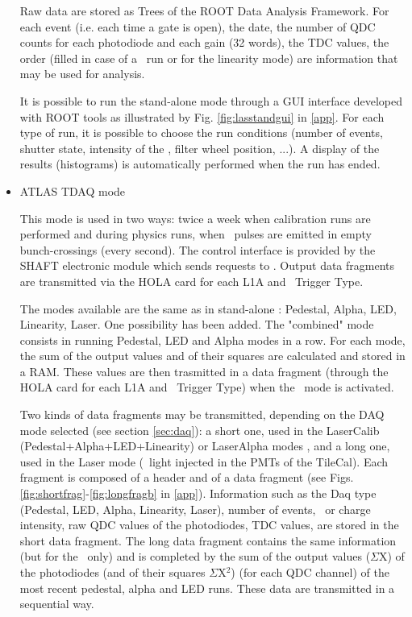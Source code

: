 \begin{itemize}
Raw data are stored as Trees of the ROOT \cite{ref:root} Data Analysis Framework. For each event (i.e. each time a gate is open), the date, the number of QDC counts for each photodiode and each gain (32 words), the TDC values, the order (filled in case of a \laser~run or for the linearity mode) are information that may be used for analysis. 

It is possible to run the stand-alone mode through a GUI interface developed with ROOT tools as illustrated by Fig. \ref{fig:lasstandgui} in \ref{app}. For each type of run, it is possible to choose the run conditions (number of events, shutter state, intensity of the \laser, filter wheel position, ...). A display of the results (histograms) is automatically performed when the run has ended.

\item ATLAS TDAQ mode

This mode is used in two ways: twice a week when calibration runs are performed and during physics runs, when \laser~pulses are emitted in empty bunch-crossings (every second). The control interface is provided by the SHAFT electronic module which sends requests to \lascar. Output data fragments are transmitted via the HOLA card for each L1A and \laser~Trigger Type.

The modes available are the same as in stand-alone : Pedestal, Alpha, LED, Linearity, Laser. One possibility has been added. The "combined" mode consists in running Pedestal, LED and Alpha modes in a row. For each mode, the sum of the output values and of their squares are calculated and stored in a RAM. These values are then trasmitted in a data fragment (through the HOLA card for each L1A and \laser~Trigger Type) when the \laser~mode is activated.

Two kinds of data fragments may be transmitted, depending on the DAQ mode selected (see section \ref{sec:daq}): a short one, used in the LaserCalib (Pedestal+Alpha+LED+Linearity) or LaserAlpha modes , and a long one, used in the Laser mode (\laser~light injected in the PMTs of the TileCal). Each fragment is composed of a header and of a data fragment (see Figs. \ref{fig:shortfrag}-\ref{fig:longfragb} in \ref{app}). Information such as the Daq type (Pedestal, LED, Alpha, Linearity, Laser), number of events, \laser~or charge intensity, raw QDC values of the photodiodes, TDC values, are stored in the short data fragment. The long data fragment contains the same information (but for the \laser~only) and is completed by the sum of the output values ($\Sigma$X) of the photodiodes (and of their squares $\Sigma$X$^{2}$) (for each QDC channel) of the most recent pedestal, alpha and LED runs. These data are transmitted in a sequential way. 

\end{itemize}
